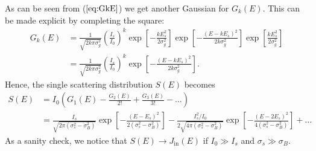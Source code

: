 As can be seen from ($\ref{eq:GkE}$) we get another Gaussian for $G_k(E)$. This can be made explicit by completing the square:
\begin{align}
\nonumber G_k(E) &= \frac{1}{\sqrt{2k \pi \sigma_g^2}}\left(\frac{I_s}{I_0}\right)^k \exp\left[-\frac{kE_s^2}{2\sigma_g^2}\right]\exp\left[-\frac{(E-kE_s)^2}{2k\sigma_g^2}\right]\exp\left[\frac{kE_s^2}{2\sigma_g^2}\right]\\
&=\frac{1}{\sqrt{2k \pi \sigma_g^2}}\left(\frac{I_s}{I_0}\right)^k \exp\left[-\frac{(E-kE_s)^2}{2k\sigma_g^2}\right].
\end{align}
Hence, the single scattering distribution $S(E)$ becomes
\begin{align}
\nonumber S(E) &= I_0\left(G_1(E)-\frac{G_2(E)}{2!}+\frac{G_3(E)}{3!}-\dots\right)\\
&= \frac{I_s}{\sqrt{2\pi(\sigma_s^2-\sigma_B^2)}}\exp\left[-\frac{(E-E_s)^2}{2(\sigma_s^2-\sigma_B^2)}\right]-\frac{I_s^2/I_0}{2\sqrt{4\pi(\sigma_s^2-\sigma_B^2)}}\exp\left[-\frac{(E-2E_s)^2}{4(\sigma_s^2-\sigma_B^2)}\right]+\dots
\end{align}
As a sanity check, we notice that $S(E)\rightarrow J_{\mathrm{in}}(E)$ if $I_0\gg I_s$ and $\sigma_s \gg \sigma_B$. 







